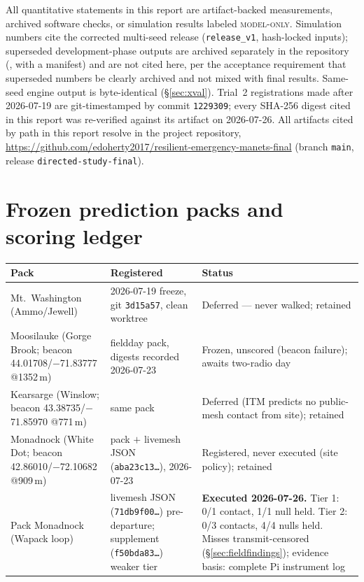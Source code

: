 \documentclass[11pt]{article}
\newcommand{\modelonly}{\textsc{model-only}}
\newcommand{\code}[1]{\texttt{\small #1}}
\begin{document}
All quantitative statements in this report are artifact-backed measurements,
archived software checks, or simulation results labeled \modelonly. Simulation
numbers cite the corrected multi-seed release (\code{release\_v1},
hash-locked inputs); superseded development-phase outputs are archived
separately in the repository (, with a manifest)
and are not cited here, per the acceptance requirement that superseded numbers
be clearly archived and not mixed with final results. Same-seed engine output
is byte-identical (\S\ref{sec:xval}). Trial~2 registrations made after
2026-07-19 are git-timestamped by commit \code{1229309}; every SHA-256 digest cited in
this report was re-verified against its artifact on 2026-07-26. All artifacts
cited by path in this report resolve in the project repository,
\url{https://github.com/edoherty2017/resilient-emergency-manets-final} (branch \code{main}, release \code{directed-study-final}).

\appendix

\section{Frozen prediction packs and scoring ledger}\label{app:packs}

\begin{table}[h]
\small
\begin{tabularx}{\textwidth}{@{}p{3.4cm}p{4.6cm}X@{}}
\toprule
\textbf{Pack} & \textbf{Registered} & \textbf{Status} \\
\midrule
Mt.~Washington (Ammo/Jewell) & 2026-07-19 freeze, git \code{3d15a57}, clean worktree & Deferred --- never walked; retained \\
Moosilauke (Gorge Brook; beacon 44.01708/$-$71.83777 @1352\,m) & fieldday pack, digests recorded 2026-07-23 & Frozen, unscored (beacon failure); awaits two-radio day \\
Kearsarge (Winslow; beacon 43.38735/$-$71.85970 @771\,m) & same pack & Deferred (ITM predicts no public-mesh contact from site); retained \\
Monadnock (White Dot; beacon 42.86010/$-$72.10682 @909\,m) & pack $+$ livemesh JSON (\code{aba23c13\ldots}), 2026-07-23 & Registered, never executed (site policy); retained \\
Pack Monadnock (Wapack loop) & livemesh JSON (\code{71db9f00\ldots}) pre-departure; supplement (\code{f50bda83\ldots}) weaker tier & \textbf{Executed 2026-07-26.} Tier 1: 0/1 contact, 1/1 null held. Tier 2: 0/3 contacts, 4/4 nulls held. Misses transmit-censored (\S\ref{sec:fieldfindings}); evidence basis: complete Pi instrument log \\
\bottomrule
\end{tabularx}
\end{table}
\end{document}
